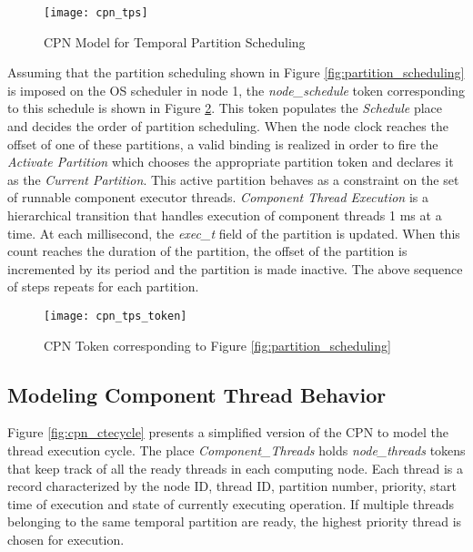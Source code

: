 \vspace{-0.08in}
\begin{figure}[ht]
\centering
\texttt{[image: cpn\_tps]}
\caption{CPN Model for Temporal Partition Scheduling}
\label{fig:cpn_tps}
\vspace{-0.2in}
\end{figure}
\vspace{0.05in}

Assuming that the partition scheduling shown in Figure \ref{fig:partition_scheduling} is imposed on the OS scheduler in node 1, the \emph{node\_schedule} token corresponding to this schedule is shown in Figure \ref{fig:cpn_tps_token}. This token populates the \emph{Schedule} place and decides the order of partition scheduling. When the node clock reaches the offset of one of these partitions, a valid binding is realized in order to fire the \emph{Activate Partition} which chooses the appropriate partition token and declares it as the \emph{Current Partition}. This active partition behaves as a constraint on the set of runnable component executor threads. \emph{Component Thread Execution} is a hierarchical transition that handles execution of component threads 1 ms at a time. At each millisecond, the \emph{exec\_t} field of the partition is updated. When this count reaches the duration of the partition, the offset of the partition is incremented by its period and the partition is made inactive. The above sequence of steps repeats for each partition.

\vspace{-0.08in}
\begin{figure}[ht]
\centering
\texttt{[image: cpn\_tps\_token]}
\caption{CPN Token corresponding to Figure \ref{fig:partition_scheduling}}
\label{fig:cpn_tps_token}
\vspace{-0.18in}
\end{figure}
   
\subsection{Modeling Component Thread Behavior}
\label{sec:Modeling_Component_Thread_Lifecycle}

Figure \ref{fig:cpn_ctecycle} presents a simplified version of the CPN to model the thread execution cycle. The place \emph{Component\_Threads} holds \emph{node\_threads} tokens that keep track of all the ready threads in each computing node. Each thread is a record characterized by the node ID, thread ID, partition number, priority, start time of execution and state of currently executing operation. If multiple threads belonging to the same temporal partition are ready, the highest priority thread is chosen for execution. 

